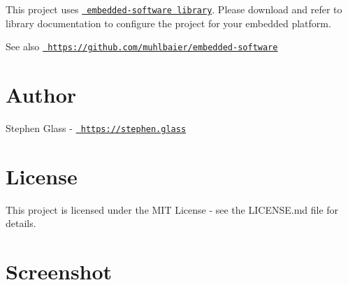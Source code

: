 This project uses \href{https://github.com/muhlbaier/embedded-software}{\texttt{ embedded-\/software library}}. Please download and refer to library documentation to configure the project for your embedded platform. \begin{DoxySeeAlso}{See also}
\href{https://github.com/muhlbaier/embedded-software}{\texttt{ https\+://github.\+com/muhlbaier/embedded-\/software}}
\end{DoxySeeAlso}
\hypertarget{index_author}{}\section{Author}\label{index_author}

\begin{DoxyItemize}
\item Stephen Glass -\/ \href{https://stephen.glass}{\texttt{ https\+://stephen.\+glass}}
\end{DoxyItemize}\hypertarget{index_license}{}\section{License}\label{index_license}
This project is licensed under the M\+IT License -\/ see the L\+I\+C\+E\+N\+SE.md file for details.\hypertarget{index_screenshot}{}\section{Screenshot}\label{index_screenshot}
 